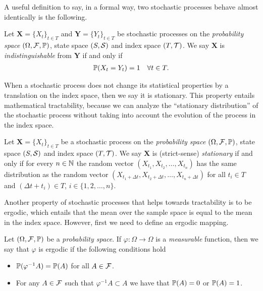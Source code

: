 A useful definition to say, in a formal way, two stochastic processes behave almost identically is the following.
%
\begin{definition} \label{def:indistinguishable}
    Let $\bm{X} = \{X_t\}_{t\in T}$ and $\bm{Y} = \{Y_t\}_{t\in T}$ be stochastic processes on the \textit{probability space} $(\Omega,\cal F, \P)$, state space $(S,\cal S)$ and index space $(T,\cal{T})$.
    We say $\bm{X}$ is \textit{indistinguishable} from $\bm{Y}$ if and only if
    \begin{align*}
        \P(X_t = Y_t) = 1\quad \forall t\in T.
    \end{align*}
\end{definition}

When a stochastic process does not change its statistical properties by a translation on the index space, then we say it is stationary. This property entails mathematical tractability, because we can analyze the ``stationary distribution'' of the stochastic process without taking into account the evolution of the process in the index space.
%
\begin{definition} \label{def:stationary}
    Let $\bm{X} = \{X_t\}_{t\in T}$ be a stochastic process on the \textit{probability space} $(\Omega,\cal F, \P)$, state space $(S,\cal S)$ and index space $(T,\cal{T})$.
    We say $\bm{X}$ is (strict-sense) \textit{stationary} if and only if for every $n\in\N$ the random vector
    $(X_{t_1}, X_{t_2}, \dots, X_{t_n})$ has the same distribution as the random vector
    $(X_{t_1+\Delta t}, X_{t_2+\Delta t}, \dots, X_{t_n+\Delta t})$ for all $t_i\in T$ and $(\Delta t + t_i) \in T$, $i\in\{1,2,\dots,n\}$.
\end{definition}

Another property of stochastic processes that helps towards tractability is to be ergodic, which entails that the mean over the sample space is equal to the mean in the index space.
%
However, first we need to define an ergodic mapping.
%
\begin{definition} \label{def:ergodic}
    Let $(\Omega,\cal F, \P)$ be a \textit{probability space}. If $\varphi:\Omega\longrightarrow\Omega$ is a \textit{measurable} function, then we say that $\varphi$ is ergodic if the following conditions hold
    \begin{itemize}[noitemsep]
        \item $\P(\varphi^{-1}A) = \P(A)$ for all $A\in\cal F$.
        \item For any $A\in\cal F$ such that $\varphi^{-1}A\subset A$ we have that $\P(A) = 0$ or $\P(A) = 1$.
    \end{itemize}
\end{definition}

